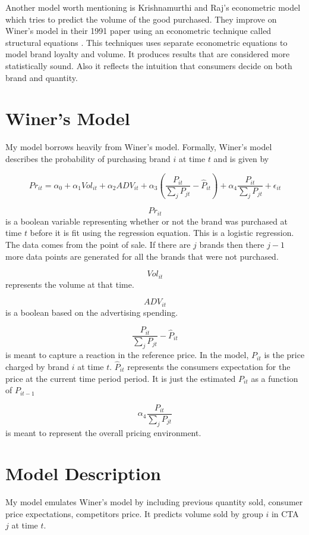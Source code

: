 \documentclass{article}
\begin{document}
Another model worth mentioning is Krishnamurthi and Raj's econometric model which tries to predict the volume of the good purchased. They improve on Winer's model in their 1991 paper using an econometric technique called structural equations \cite{krishnamurthi}. This techniques uses separate econometric equations to model brand loyalty and volume. It produces results that are considered more statistically sound. Also it reflects the intuition that consumers decide on both brand and quantity.



\section{Winer's Model}
My model borrows heavily from Winer's model. Formally, Winer's model describes the probability of purchasing brand $i$ at time $t$ and is given by

$$ {Pr}_{it} = \alpha_0 + \alpha_1 Vol_{it} + \alpha_2 ADV_{it} +  \alpha_3 (\dfrac{P_{it}} {\sum_j P_{jt}} - \hat{P}_{it})+ \alpha_4 \dfrac {P_{it}}{\sum_j P_{jt}} + \epsilon_{it}$$

$${Pr}_{it}$$ is a boolean variable representing whether or not the brand was purchased at time $t$ before it is fit using the regression equation. This is a logistic regression. The data comes from the point of sale. If there are $j$ brands then there $j-1$ more data points are generated for all the brands that were not purchased.

$$Vol_{it}$$ represents the volume at that time.

$$ADV_{it}$$ is a boolean based on the advertising spending.

$$\dfrac{P_{it}} {\sum_j P_{jt}} - \hat{P}_{it}$$ is meant to capture a reaction in the reference price.  In the model, $P_{it}$ is the price charged by brand $i$ at time $t$. $\hat{P}_{it}$ represents the consumers expectation for the price at the current time period period. It is just the estimated ${P}_{it}$ as a function of ${P}_{it-1}$ 

$$ \alpha_4 \dfrac {P_{it}}{\sum_j P_{jt}}$$ is meant to represent the overall pricing environment.

\section{Model Description}

My model emulates Winer's model by including previous quantity sold, consumer price expectations, competitors price. It predicts volume sold by group $i$ in CTA $j$ at time $t$.
\end{document}
